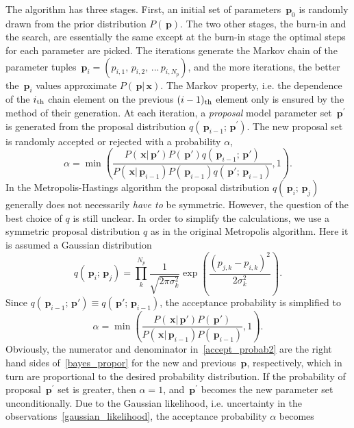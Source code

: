 \documentclass[preprint2]{aastex}
\newcommand{\bfp}{\,\mathbf{p}}
\newcommand{\bfx}{\,\mathbf{x}}
\begin{document}
The algorithm has three stages. First, an initial set of parameters $\bfp_0$ is randomly drawn from the prior distribution $P(\bfp)$. The two other stages, the burn-in and the search, are essentially the same except at the burn-in stage the optimal steps for each parameter are picked. The iterations generate the Markov chain of the parameter tuples $\bfp_i = \left(p_{i,1},\, p_{i,2},\, ...\, p_{i,N_p} \right)$, and the more iterations, the better the $\bfp_i$ values approximate $P(\bfp|\bfx)$. The Markov property, i.e. the dependence of the $i_{\rm th}$ chain element on the previous $(i-1)_{\rm th}$ element only is ensured by the method of their generation. At each iteration, a \emph{proposal} model parameter set $\bfp^\prime$ is generated from the proposal distribution $q(\bfp_{i-1};\bfp^\prime)$. The new proposal set is randomly accepted or rejected with a probability $\alpha$,
\begin{equation}
  \label{accept_probab}
  \alpha =  \min \left( \frac{P(\bfx|\bfp')P(\bfp')q(\bfp_{i-1};\bfp')} 
            {P(\bfx|\bfp_{i-1})P(\bfp_{i-1})q(\bfp';\bfp_{i-1})}, 1 \right).
\end{equation}
In the Metropolis-Hastings algorithm the proposal distribution $q(\bfp_i;\bfp_j)$ generally does not necessarily \emph{have to} be symmetric. However, the question of the best choice of $q$ is still unclear. In order to simplify the calculations, we use a symmetric proposal distribution $q$ as in the original Metropolis algorithm. Here it is  assumed a Gaussian distribution
\begin{equation}
  \label{gaussian_prop_distr}
  q(\bfp_i;\bfp_j) = \prod^{N_p}_{k} \frac{1}{\sqrt{2 \pi \sigma^2_k}} 
                   \exp \left( \frac{(p_{j,k} - p_{i,k})^2}{2 \sigma^2_k} \right).
\end{equation}
Since $q(\bfp_{i-1};\bfp') \equiv q(\bfp';\bfp_{i-1})$, the acceptance probability is simplified to
\begin{equation}
  \label{accept_probab2}
  \alpha =  \min \left( \frac{P(\bfx|\bfp')P(\bfp')} {P(\bfx|\bfp_{i-1})P(\bfp_{i-1})}, 1 \right).
\end{equation}
Obviously, the numerator and denominator in~\eqref{accept_probab2} are the right hand sides of~\eqref{bayes_propor} for the new and previous $\bfp$, respectively, which in turn are proportional to the desired probability distribution. If the probability of proposal $\bfp^\prime$ set is greater, then $\alpha = 1$, and $\bfp^\prime$ becomes the new parameter set unconditionally. Due to the Gaussian likelihood, i.e. uncertainty in the observations~\eqref{gaussian_likelihood}, the acceptance probability $\alpha$ becomes
\end{document}

